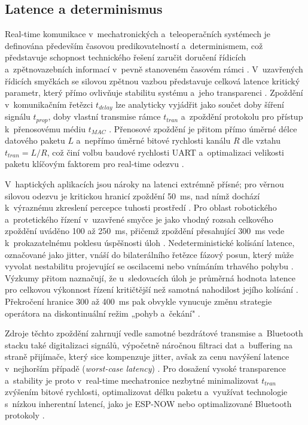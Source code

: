 \subsection{Latence a determinismus}
Real-time komunikace v~mechatronických a~teleoperačních systémech je definována především časovou predikovatelností a~determinismem, což představuje schopnost technického řešení zaručit doručení řídicích a~zpětnovazebních informací v~pevně stanoveném časovém rámci \cite{Aijaz2018, Kos2018, Bolarinwa2022}.
V~uzavřených řídicích smyčkách se silovou zpětnou vazbou představuje celková latence kritický parametr, který přímo ovlivňuje stabilitu systému a~jeho transparenci \cite{Patel2022, Suman2025, Black2025}.
Zpoždění v~komunikačním řetězci $t_{delay}$ lze analyticky vyjádřit jako součet doby šíření signálu $t_{prop}$, doby vlastní transmise rámce $t_{tran}$ a~zpoždění protokolu pro přístup k~přenosovému médiu $t_{MAC}$ \cite{Kos2018}.
Přenosové zpoždění je přitom přímo úměrné délce datového paketu $L$ a~nepřímo úměrné bitové rychlosti kanálu $R$ dle vztahu $t_{tran} = L/R$, což činí volbu baudové rychlosti UART a~optimalizaci velikosti paketu klíčovým faktorem pro real-time odezvu \cite{Kos2018}.

V~haptických aplikacích jsou nároky na latenci extrémně přísné; pro věrnou silovou odezvu je kritickou hranicí zpoždění 50~ms, nad nímž dochází k~výraznému zkreslení percepce tuhosti prostředí \cite{Patel2022, Suman2025, Almeida202098}.
Pro oblast robotického a~protetického řízení v~uzavřené smyčce je jako vhodný rozsah celkového zpoždění uváděno 100 až 250~ms, přičemž zpoždění přesahující 300~ms vede k~prokazatelnému poklesu úspěšnosti úloh \cite{Song2023823, Almeida202098}.
Nedeterministické kolísání latence, označované jako jitter, vnáší do bilaterálního řetězce fázový posun, který může vyvolat nestabilitu projevující se oscilacemi nebo vnímáním trhavého pohybu \cite{Patel2022, Black2025}.
Výzkumy přitom naznačují, že u~sledovacích úloh je průměrná hodnota latence pro celkovou výkonnost řízení kritičtější než samotná nahodilost jejího kolísání \cite{Suman2025}.
Překročení hranice 300 až 400~ms pak obvykle vynucuje změnu strategie operátora na diskontinuální režim „pohyb a~čekání" \cite{Suman2025, Bolarinwa2022, AlSaadi2023313, Almeida202098}.

Zdroje těchto zpoždění zahrnují vedle samotné bezdrátové transmise a~Bluetooth stacku také digitalizaci signálů, výpočetně náročnou filtraci dat a~buffering na straně přijímače, který sice kompenzuje jitter, avšak za cenu navýšení latence v~nejhorším případě (\textit{worst-case latency}) \cite{Patel2022, Kos2018, Suman2025}.
Pro dosažení vysoké transparence a~stability je proto v~real-time mechatronice nezbytné minimalizovat $t_{tran}$ zvýšením bitové rychlosti, optimalizovat délku paketu a~využívat technologie s~nízkou inherentní latencí, jako je ESP-NOW nebo optimalizované Bluetooth protokoly \cite{Kos2018, Eridani2021918, Papakonstantinou20251218}.

